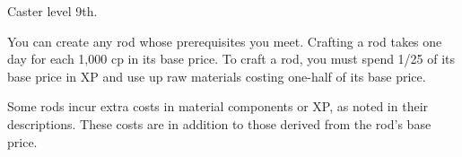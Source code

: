 




{Caster level 9th.}
{You can create any rod whose prerequisites you meet. Crafting a rod takes one day for each 1,000 cp in its base price. To craft a rod, you must spend 1/25 of its base price in XP and use up raw materials costing one-half of its base price.

Some rods incur extra costs in material components or XP, as noted in their descriptions. These costs are in addition to those derived from the rod's base price.}

